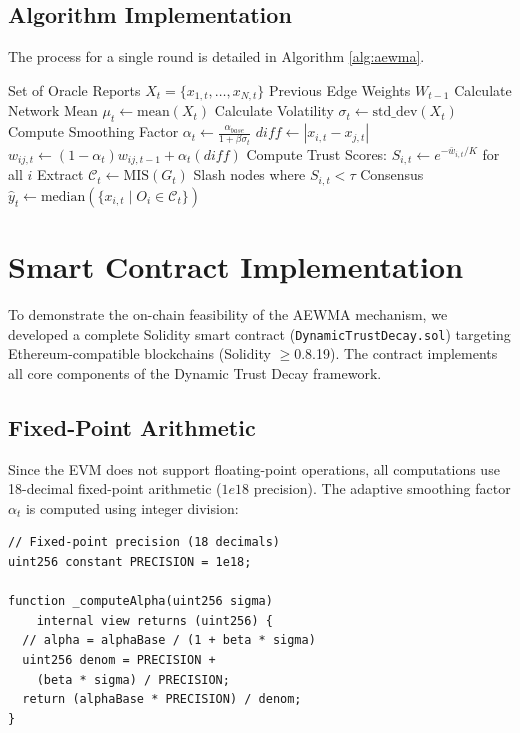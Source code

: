 \documentclass{ieeeaccess}
\begin{document}
\subsection{Algorithm Implementation}
The process for a single round is detailed in Algorithm \ref{alg:aewma}.

\begin{algorithm}[h]
\caption{Dynamic Trust Decay Algorithm}
\label{alg:aewma}
\begin{algorithmic}[1]
\small
\REQUIRE Set of Oracle Reports $X_t = \{x_{1,t}, \ldots, x_{N,t}\}$
\REQUIRE Previous Edge Weights $W_{t-1}$
\STATE Calculate Network Mean $\mu_t \leftarrow \text{mean}(X_t)$
\STATE Calculate Volatility $\sigma_t \leftarrow \text{std\_dev}(X_t)$
\STATE Compute Smoothing Factor $\alpha_t \leftarrow \frac{\alpha_{base}}{1 + \beta \sigma_t}$
    \STATE $diff \leftarrow |x_{i,t} - x_{j,t}|$
    \STATE $w_{ij,t} \leftarrow (1 - \alpha_t)w_{ij,t-1} + \alpha_t(diff)$
\ENDFOR
\STATE Compute Trust Scores: $S_{i,t} \leftarrow e^{-\bar{w}_{i,t}/K}$ for all $i$
\STATE Extract $\mathcal{C}_t \leftarrow \text{MIS}(G_t)$
\STATE Slash nodes where $S_{i,t} < \tau$
\RETURN Consensus $\hat{y}_t \leftarrow \text{median}(\{x_{i,t} \mid O_i \in \mathcal{C}_t\})$
\end{algorithmic}
\end{algorithm}

\section{Smart Contract Implementation}
\label{sec:implementation}

To demonstrate the on-chain feasibility of the AEWMA mechanism, we developed a complete Solidity smart contract (\texttt{DynamicTrustDecay.sol}) targeting Ethereum-compatible blockchains (Solidity $\geq$0.8.19). The contract implements all core components of the Dynamic Trust Decay framework.

\subsection{Fixed-Point Arithmetic}
Since the EVM does not support floating-point operations, all computations use 18-decimal fixed-point arithmetic ($1e18$ precision). The adaptive smoothing factor $\alpha_t$ is computed using integer division:
\begin{lstlisting}
// Fixed-point precision (18 decimals)
uint256 constant PRECISION = 1e18;

function _computeAlpha(uint256 sigma)
    internal view returns (uint256) {
  // alpha = alphaBase / (1 + beta * sigma)
  uint256 denom = PRECISION +
    (beta * sigma) / PRECISION;
  return (alphaBase * PRECISION) / denom;
}
\end{lstlisting}
\end{document}
